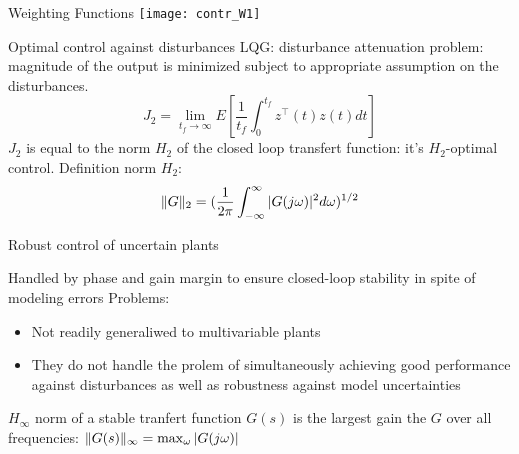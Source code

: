 \documentclass[../main/main.tex]{subfiles}
\begin{document}
\begin{frame}{Weighting Functions}
  \centering
  \texttt{[image: contr\_W1]}
\end{frame}


\begin{frame}[t]{Optimal control against disturbances}
  LQG: disturbance attenuation problem: magnitude of the output is minimized
  subject to appropriate assumption on the disturbances.
  \[ J_2 = \lim_{t_f \rightarrow \infty} E \left[ \frac{1}{t_f} \int_0^{t_f}z^\intercal(t)z(t)dt\right] \]
  $J_2$ is equal to the norm \(H_2\) of the closed loop transfert function:
  it's $H_2$-optimal control.
  Definition norm \(H_2\): \[\Vert G \Vert_{2} = ( \frac{1}{2\pi} \int_{-\infty}^{\infty}\vert G(j\omega)\vert^2 d\omega )^{1/2}\]
\end{frame}

\begin{frame}[t]{Robust control of uncertain plants}
  \begin{tcolorbox}[size=small, top=4pt,
    colback=blue!5!white,colframe=blue!75!black,title=Classical robustness against model uncertainties]
    Handled by phase and gain margin to ensure closed-loop stability in spite of modeling errors
    Problems:
    \begin{itemize}
    \item Not readily generaliwed to multivariable plants
    \item They do not handle the prolem of simultaneously achieving good
      performance against disturbances as well as robustness against model uncertainties
    \end{itemize}
  \end{tcolorbox} 
  $H_\infty$ norm of a stable tranfert function $G(s)$ is the largest gain the
  $G$ over all frequencies: \(\Vert G(s) \Vert_{\infty} = \max_\omega{\vert G(j\omega) \vert}\)
\end{frame}
\end{document}
